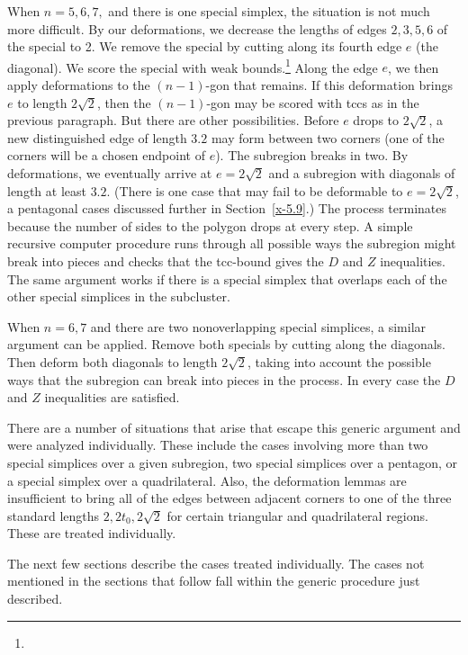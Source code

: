 When $n=5,6,7,$ and there is one special simplex, the situation is not
much more difficult.  By our deformations,  we decrease the lengths of
edges $2,3,5,6$ of the special to 2. We remove the special by cutting
along its fourth edge $e$ (the diagonal).  We score the special with
weak bounds.\footnote{} %
Along the edge $e$, we then apply
deformations to the $(n-1)$-gon that remains. If this deformation brings
$e$ to length $2\sqrt{2}$, then the $(n-1)$-gon may be scored with tccs
as in the previous paragraph.  But there are other possibilities. Before
$e$ drops to $2\sqrt{2}$, a new distinguished edge of length $3.2$ may
form between two corners (one of the corners will be a chosen endpoint
of $e$).  The subregion breaks in two. By deformations, we eventually
arrive at $e=2\sqrt2$ and a subregion with diagonals of length at least
$3.2$.  (There is one case that may fail to be deformable to
$e=2\sqrt2$, a pentagonal cases discussed further in
Section~\ref{x-5.9}.) The process terminates because the number of sides
to the polygon drops at every step. A simple recursive computer
procedure runs through all possible ways the subregion might break into
pieces and checks that the tcc-bound gives the $D$ and $Z$ inequalities.
The same argument works if there is a special simplex that overlaps each
of the other special simplices in the subcluster.

When $n=6,7$ and there are two nonoverlapping special simplices, a
similar argument can be applied. Remove both specials by cutting along
the diagonals. Then deform both diagonals to length $2\sqrt{2}$, taking
into account the possible ways that the subregion can break into pieces
in the process.  In every case the $D$ and $Z$ inequalities are
satisfied.

There are a number of situations that arise that escape this generic
argument and were analyzed individually. These include the cases
involving more than two special simplices over a given subregion, two
special simplices over a pentagon, or a special simplex over a
quadrilateral.  Also, the deformation lemmas are insufficient to bring
all of the edges between adjacent corners to one of the three standard
lengths $2,2t_0,2\sqrt{2}$ for certain triangular and quadrilateral
regions.  These are treated individually.

The next few sections describe the cases treated individually. The cases
not mentioned in the sections that follow fall within the generic
procedure just described.

